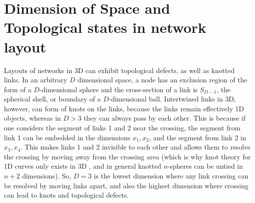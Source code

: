 \documentclass[endfloats,nofootinbib,preprint,floatfix,titlepage,superscriptaddress,linenumbers]{revtex4-1} %
\begin{document}
{%

\section{Dimension of Space and Topological states in network layout}
{ 
Layouts of networks in 3D can exhibit topological defects, as well as knotted links. 
In an arbitrary $D$ dimensional space, a node has an exclusion region of the form of a $D$-dimensional sphere and the cross-section of a link is $S_{D-1}$, the spherical shell, or boundary of a $D$-dimensional ball.
Intertwined links in 3D, however, can form of knots on the links, because the links remain effectively 1D objects, %
whereas 
in $D>3$ they  can always pass by each other. 
This is because if one considers the segment of links 1 and 2 near the crossing, the segment from link 1 can be embedded in the dimensions $x_1,x_2$, and the segment from link 2 in $x_3,x_4$. 
This makes links 1 and 2 invisible to each other and allows them to resolve the crossing by moving away from the crossing area (which is why knot theory for 1D curves only exists in 3D \cite{zeeman1963unknotting}, and in general knotted $n$-spheres can be untied in $n+2$ dimensions). 
So, $D=3$ is the lowest dimension where any link crossing can be resolved by moving links apart, and also the highest dimension where crossing can lead to knots and topological defects. %
}

}
\end{document}
